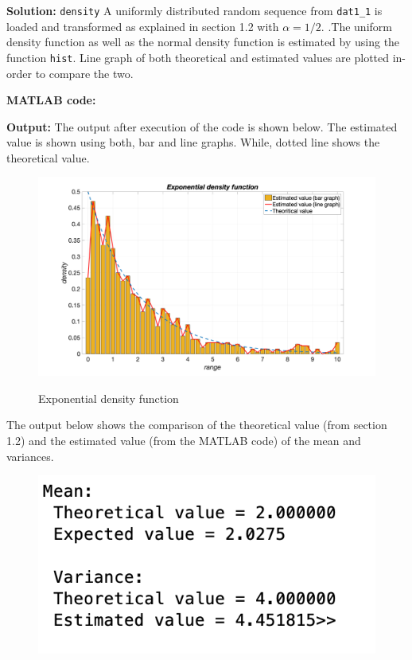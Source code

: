 \noindent \textbf{Solution:}
\noindent \texttt{density} A uniformly distributed random sequence from \texttt{dat1\_1} is loaded and transformed  as explained in section 1.2 with $\alpha = 1/2.$  .The uniform density function as well as the normal density function is estimated by using the function \texttt{hist}. Line graph of both theoretical and estimated values are plotted in-order to compare the two. 

\noindent \textbf{MATLAB code:}


\noindent \textbf{Output:}
\noindent The output after execution of the code is shown below. The estimated value is shown using both, bar and line graphs. While, dotted line shows the theoretical value.
\begin{figure}[H]
\centering
{\includegraphics[scale=0.16]{ass2_1.png}}
\caption{Exponential density function}
\label{Exponential density function}
\end{figure}


\noindent The output below shows the comparison of the theoretical value (from section 1.2) and the estimated value (from the MATLAB code) of the mean and variances.
\begin{figure}[H]
\centering
{\includegraphics[scale=0.63]{ass2_2.png}}
\end{figure}

